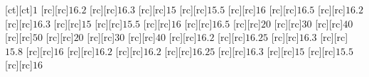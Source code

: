 [ct][ct]{\matlabtextA $1$}%
%
%
%
[rc][rc]{\matlabtextA $16.2$}%
[rc][rc]{\matlabtextA $16.3$}%
[rc][rc]{\matlabtextA $15$}%
[rc][rc]{\matlabtextA $15.5$}%
[rc][rc]{\matlabtextA $16$}%
[rc][rc]{\matlabtextA $16.5$}%
[rc][rc]{\matlabtextA $16.2$}%
[rc][rc]{\matlabtextA $16.3$}%
[rc][rc]{\matlabtextA $15$}%
[rc][rc]{\matlabtextA $15.5$}%
[rc][rc]{\matlabtextA $16$}%
[rc][rc]{\matlabtextA $16.5$}%
[rc][rc]{\matlabtextA $20$}%
[rc][rc]{\matlabtextA $30$}%
[rc][rc]{\matlabtextA $40$}%
[rc][rc]{\matlabtextA $50$}%
[rc][rc]{\matlabtextA $20$}%
[rc][rc]{\matlabtextA $30$}%
[rc][rc]{\matlabtextA $40$}%
[rc][rc]{\matlabtextA $16.2$}%
[rc][rc]{\matlabtextA $16.25$}%
[rc][rc]{\matlabtextA $16.3$}%
[rc][rc]{\matlabtextA $15.8$}%
[rc][rc]{\matlabtextA $16$}%
[rc][rc]{\matlabtextA $16.2$}%
[rc][rc]{\matlabtextA $16.2$}%
[rc][rc]{\matlabtextA $16.25$}%
[rc][rc]{\matlabtextA $16.3$}%
[rc][rc]{\matlabtextA $15$}%
[rc][rc]{\matlabtextA $15.5$}%
[rc][rc]{\matlabtextA $16$}%
%
